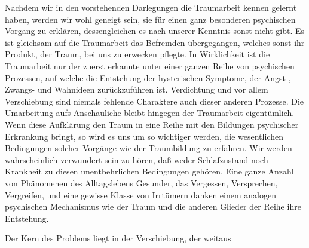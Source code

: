 \documentclass{article}
\begin{document}
            
        \pstart
        Nachdem wir in den vorstehenden Darlegungen die Traumarbeit kennen
               gelernt haben, werden wir wohl geneigt sein, sie für einen ganz besonderen
               psychischen Vorgang zu erklären, dessengleichen es nach unserer Kenntnis sonst
               nicht gibt. Es ist gleichsam auf die Traumarbeit das Befremden
               übergegangen, welches sonst ihr Produkt, der Traum, bei uns zu erwecken
               pflegte. In Wirklichkeit ist die Traumarbeit nur der zuerst erkannte unter einer
               ganzen Reihe von psychischen Prozessen, auf welche die Entstehung der
               hysterischen Symptome, der Angst-, Zwangs- und Wahnideen zurückzuführen ist.
               Verdichtung und vor allem Verschiebung sind niemals fehlende Charaktere
               auch dieser anderen Prozesse. Die Umarbeitung aufs Anschauliche bleibt
               hingegen der Traumarbeit eigentümlich. Wenn diese Aufklärung den Traum in eine
               Reihe mit den Bildungen psychischer Erkrankung bringt, so wird es uns
               um so wichtiger werden, die wesentlichen Bedingungen solcher Vorgänge wie der
               Traumbildung zu erfahren. Wir werden wahrscheinlich verwundert sein zu
               hören, daß weder Schlafzustand noch Krankheit zu diesen unentbehrlichen Bedingungen gehören. Eine ganze Anzahl von Phänomenen des
               Alltagslebens Gesunder, das Vergessen, Versprechen, Vergreifen, und
               eine gewisse Klasse von Irrtümern danken einem analogen psychischen Mechanismus
               wie der Traum und die anderen Glieder der Reihe ihre Entstehung.
        \pend
    
            
        \pstart
        Der Kern des Problems liegt in der Verschiebung, der weitaus
        \pend
    
         
            
            
            
\end{document}
